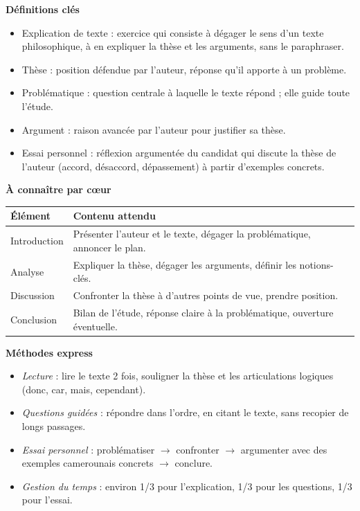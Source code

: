 \documentclass[11pt]{article}
\newcommand{\cle}[1]{{\popxbold\color{popdark}#1}}
\begin{document}
\begin{bilan}
\textbf{Définitions clés}
\begin{itemize}
\item \cle{Explication de texte} : exercice qui consiste à dégager le sens d'un texte philosophique, à en expliquer la thèse et les arguments, sans le paraphraser.
\item \cle{Thèse} : position défendue par l'auteur, réponse qu'il apporte à un problème.
\item \cle{Problématique} : question centrale à laquelle le texte répond ; elle guide toute l'étude.
\item \cle{Argument} : raison avancée par l'auteur pour justifier sa thèse.
\item \cle{Essai personnel} : réflexion argumentée du candidat qui discute la thèse de l'auteur (accord, désaccord, dépassement) à partir d'exemples concrets.
\end{itemize}

\textbf{À connaître par c\oe ur}
\begin{center}
\begin{tabularx}{\linewidth}{|l|X|}
\hline
\rowcolor{popblueL} \textbf{Élément} & \textbf{Contenu attendu} \\
\hline
Introduction & Présenter l'auteur et le texte, dégager la problématique, annoncer le plan. \\
\hline
Analyse & Expliquer la thèse, dégager les arguments, définir les notions-clés. \\
\hline
Discussion & Confronter la thèse à d'autres points de vue, prendre position. \\
\hline
Conclusion & Bilan de l'étude, réponse claire à la problématique, ouverture éventuelle. \\
\hline
\end{tabularx}
\end{center}

\textbf{Méthodes express}
\begin{itemize}
\item \emph{Lecture} : lire le texte 2 fois, souligner la thèse et les articulations logiques (donc, car, mais, cependant).
\item \emph{Questions guidées} : répondre dans l'ordre, en citant le texte, sans recopier de longs passages.
\item \emph{Essai personnel} : problématiser $\rightarrow$ confronter $\rightarrow$ argumenter avec des exemples camerounais concrets $\rightarrow$ conclure.
\item \emph{Gestion du temps} : environ 1/3 pour l'explication, 1/3 pour les questions, 1/3 pour l'essai.
\end{itemize}
\end{bilan}
\end{document}
